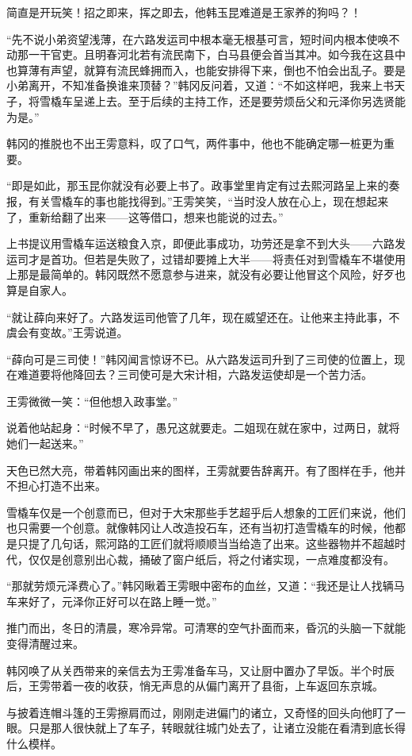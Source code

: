 简直是开玩笑！招之即来，挥之即去，他韩玉昆难道是王家养的狗吗？！

“先不说小弟资望浅薄，在六路发运司中根本毫无根基可言，短时间内根本使唤不动那一干官吏。且明春河北若有流民南下，白马县便会首当其冲。如今我在这县中也算薄有声望，就算有流民蜂拥而入，也能安排得下来，倒也不怕会出乱子。要是小弟离开，不知准备换谁来顶替？”韩冈反问着，又道：“不如这样吧，我来上书天子，将雪橇车呈递上去。至于后续的主持工作，还是要劳烦岳父和元泽你另选贤能为是。”

韩冈的推脱也不出王雱意料，叹了口气，两件事中，他也不能确定哪一桩更为重要。

“即是如此，那玉昆你就没有必要上书了。政事堂里肯定有过去熙河路呈上来的奏报，有关雪橇车的事也能找得到。”王雱笑笑，“当时没人放在心上，现在想起来了，重新给翻了出来——这等借口，想来也能说的过去。”

上书提议用雪橇车运送粮食入京，即便此事成功，功劳还是拿不到大头——六路发运司才是首功。但若是失败了，过错却要摊上大半——将责任对到雪橇车不堪使用上那是最简单的。韩冈既然不愿意参与进来，就没有必要让他冒这个风险，好歹也算是自家人。

“就让薛向来好了。六路发运司他管了几年，现在威望还在。让他来主持此事，不虞会有变故。”王雱说道。

“薛向可是三司使！”韩冈闻言惊讶不已。从六路发运司升到了三司使的位置上，现在难道要将他降回去？三司使可是大宋计相，六路发运使却是一个苦力活。

王雱微微一笑：“但他想入政事堂。”

说着他站起身：“时候不早了，愚兄这就要走。二姐现在就在家中，过两日，就将她们一起送来。”

天色已然大亮，带着韩冈画出来的图样，王雱就要告辞离开。有了图样在手，他并不担心打造不出来。

雪橇车仅是一个创意而已，但对于大宋那些手艺超乎后人想象的工匠们来说，他们也只需要一个创意。就像韩冈让人改造投石车，还有当初打造雪橇车的时候，他都是只提了几句话，熙河路的工匠们就将顺顺当当给造了出来。这些器物并不超越时代，仅仅是创意别出心裁，捅破了窗户纸后，将之付诸实现，一点难度都没有。

“那就劳烦元泽费心了。”韩冈瞅着王雱眼中密布的血丝，又道：“我还是让人找辆马车来好了，元泽你正好可以在路上睡一觉。”

推门而出，冬日的清晨，寒冷异常。可清寒的空气扑面而来，昏沉的头脑一下就能变得清醒过来。

韩冈唤了从关西带来的亲信去为王雱准备车马，又让厨中置办了早饭。半个时辰后，王雱带着一夜的收获，悄无声息的从偏门离开了县衙，上车返回东京城。

与披着连帽斗篷的王雱擦肩而过，刚刚走进偏门的诸立，又奇怪的回头向他盯了一眼。只是那人很快就上了车子，转眼就往城门处去了，让诸立没能在看清到底长得什么模样。

